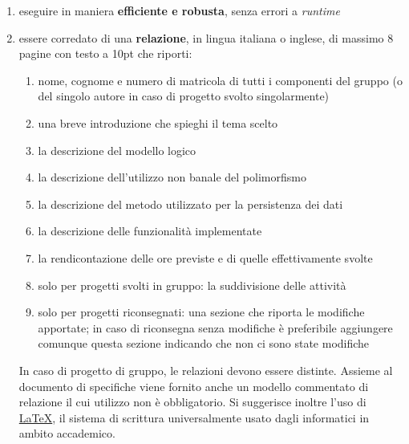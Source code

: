 \documentclass[10pt,a4paper,oneside]{article}
\begin{document}
\begin{enumerate}
 \item eseguire in maniera \textbf{efficiente e robusta}, senza errori a \emph{runtime}
 \item essere corredato di una \textbf{relazione}, in lingua italiana o inglese, di massimo 8 pagine con testo a 10pt che riporti:
 \begin{enumerate}
  \item nome, cognome e numero di matricola di tutti i componenti del gruppo (o del singolo autore in caso di progetto svolto singolarmente)
  \item una breve introduzione che spieghi il tema scelto
  \item la descrizione del modello logico
  \item la descrizione dell'utilizzo non banale del polimorfismo
  \item la descrizione del metodo utilizzato per la persistenza dei dati
  \item la descrizione delle funzionalità implementate
  \item la rendicontazione delle ore previste e di quelle effettivamente svolte
  \item solo per progetti svolti in gruppo: la suddivisione delle attività
  \item solo per progetti riconsegnati: una sezione che riporta le modifiche apportate; in caso di riconsegna senza modifiche è preferibile aggiungere comunque questa sezione indicando che non ci sono state modifiche
 \end{enumerate}
 In caso di progetto di gruppo, le relazioni devono essere distinte. Assieme al documento di specifiche viene fornito anche un modello commentato di relazione il cui utilizzo non è obbligatorio. Si suggerisce inoltre l'uso di \href{https://it.wikipedia.org/wiki/LaTeX}{LaTeX}, il sistema di scrittura universalmente usato dagli informatici in ambito accademico.
\end{enumerate}

\end{document}
